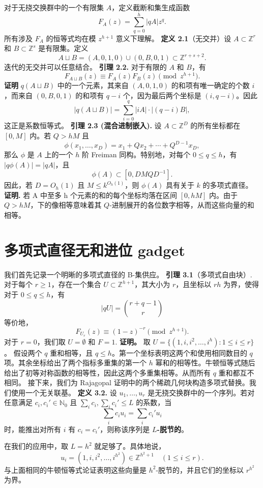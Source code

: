 \documentclass[11pt]{article}
\theoremstyle{break}
\begin{document}
对于无挠交换群中的一个有限集 $A$，定义截断和集生成函数
\[
F_A(z) = \sum_{q=0}^{h} |qA| z^q.
\]
所有涉及 $F_A$ 的恒等式均在模 $z^{h+1}$ 意义下理解。
\textbf{定义 2.1}（无交并）\quad 设 $A \subset \mathbb{Z}^r$ 和 $B \subset \mathbb{Z}^s$ 是有限集。定义
\[ A \sqcup B = (A,0,1,0) \cup (0,B,0,1) \subset \mathbb{Z}^{r+s+2}. \]
迭代的无交并可以任意结合。
\textbf{引理 2.2.} 对于有限的 $A$ 和 $B$，有
\[F_{A \sqcup B}(z) \equiv F_A(z) F_B(z) \pmod{z^{h+1}}.\]
\textbf{证明} $q(A \sqcup B)$ 中的一个元素，其来自 $(A, 0, 1, 0)$ 的和项有唯一确定的个数 $i$，而来自 $(0, B, 0, 1)$ 的和项有 $q-i$ 个，因为最后两个坐标是 $(i, q-i)$。因此
\[
|q(A \sqcup B)| = \sum_{i=0}^{q} |iA| \cdot |(q-i)B|,
\]
这正是系数恒等式。
\textbf{引理 2.3 (混合进制嵌入).} 设 $A \subset \mathbb{Z}^D$ 的所有坐标都在 $[0, M]$ 内。若 $Q > hM$ 且
\[
\phi(x_1, \dots, x_D) = x_1 + Q x_2 + \cdots + Q^{D-1} x_D,
\]
那么 \(\phi\) 是 \(A\) 上的一个 \(h\) 阶 Freiman 同构。特别地，对每个 \(0 \leq q \leq h\)，有 \(|q\phi(A)| = |qA|\)，且
\[
\phi(A) \subset [0, D M Q D^{-1}].
\]
因此，若 \(D = O_h(1)\) 且 \(M \leq k^{O_h(1)}\)，则 \(\phi(A)\) 具有关于 \(k\) 的多项式直径。
\textbf{证明.} 若 A 中至多 h 个元素的和的每个坐标均落在区间 $[0, hM]$ 内。由于 $Q > hM$，\phi 下的像相等意味着其 $Q$-进制展开的各位数字相等，从而这些向量的和相等。
\section{多项式直径无和进位 gadget}
我们首先记录一个明晰的多项式直径的 B-集供应。
\textbf{引理 3.1}（多项式自由块）. 对于每个 $r \ge 1$，存在一个集合 $U \subset \mathbb{Z}^{h+1}$，其大小为 $r$，且坐标以 $rh$ 为界，使得对于 $0 \le q \le h$，有
\[
|qU| = \binom{r+q-1}{r}
\]
等价地，
\[
F_{U_r}(z) \equiv (1-z)^{-r} \pmod{z^{h+1}}.
\]
对于 $r=0$，我们取 $U=\emptyset$ 和 $F=1$.
\textbf{证明。} 取 $U = \{(1,i,i^2,\dots,i^h) : 1 \le i \le r\}$。 假设两个 $q$ 重和相等，且 $q \le h$。第一个坐标表明这两个和使用相同数目的 $q$ 项。其余坐标给出了两个指标多重集的第一个 $h$ 幂和的相等性。牛顿恒等式随后给出了初等对称函数的相等性，因此这两个多重集相等。从而所有 $q$ 重和都互不相同。 接下来，我们为 Rajagopal 证明中的两个稀疏几何块构造多项式替换。我们使用一个无关联基。
\textbf{定义 3.2.} 设 $u_1, \dots, u_r$ 是无挠交换群中的一个序列。若对任意满足 $c_i, c_i' \in \mathbb{N}_0$ 且 $\sum_i c_i, \sum_i c_i' \leq L$ 的系数，当
\[
\sum_i c_i u_i = \sum_i c_i' u_i
\]
时，能推出对所有 $i$ 有 $c_i = c_i'$，则称该序列是 \textbf{$L$-脱节的}。

在我们的应用中，取 $L = h^2$ 就足够了。具体地说，
\[
u_i = (1, i, i^2, \dots, i^{h^2}) \in \mathbb{Z}^{h^2+1} \quad (1 \leq i \leq r).
\]
与上面相同的牛顿恒等式论证表明这些向量是 $h^2$-脱节的，并且它们的坐标以 $r^{h^2}$ 为界。
\end{document}

